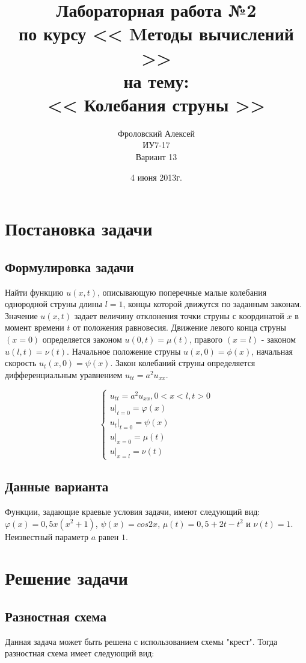 \documentclass[a4paper,12pt]{report}
\author{Фроловский Алексей \\ ИУ7-17 \\ Вариант 13}
\title{Лабораторная работа №2 \\ по курсу << Mетоды вычислений >>  \\ на тему: \\  
<< Колебания струны >> }
\date{4 июня 2013г.}
\begin{document}
\maketitle

\chapter{Постановка задачи}
\section{Формулировка задачи}
Найти функцию $u(x, t)$, описывающую поперечные малые колебания однородной струны длины $l = 1$,
концы которой движутся по заданным законам. Значение $u(x, t)$ задает величину отклонения точки
струны с координатой $x$ в момент времени $t$ от положения равновесия. Движение левого конца струны
$(x = 0)$ определяется законом $u(0, t) = \mu(t)$, правого $(x = l)$ - законом $u(l, t) = \nu (t)$. Начальное
положение струны $u(x, 0) = \phi(x)$, начальная скорость $u_{t}(x, 0) = \psi(x)$. Закон колебаний струны
определяется дифференциальным уравнением $u_{tt} = a^{2}u_{xx}$.

\begin{displaymath}
	\left\{
		\begin{array}{l}
			u_{tt}= a^{2}u_{xx}, 0 < x < l, t > 0 \\
			u\vert_{t=0} =  \varphi(x)  \\
			u_{t}\vert_{t=0} =  \psi(x)  \\
			u\vert_{x=0} =  \mu(t) \\
			u\vert_{x=l} =  \nu(t)
		\end{array} \right.
\end{displaymath}

\section{Данные варианта}
Функции, задающие краевые условия задачи, имеют следующий вид:$\varphi(x) = 0,5x(x^{2} + 1)$,
$\psi(x) = cos 2x$, $\mu(t) = 0,5 + 2t - t^{2}$ и $\nu(t) = 1$. Неизвестный параметр $a$ равен $1$.

\chapter{Решение задачи}
\section{Разностная схема}
Данная задача может быть решена с использованием схемы "крест". Тогда разностная схема имеет
следующий вид:
\end{document}
